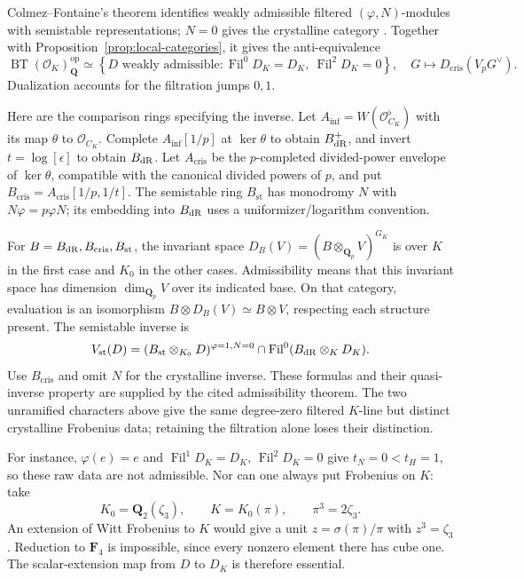 \documentclass[11pt]{article}
\theoremstyle{definition}\newtheorem{definition}[theorem]{Definition}
\theoremstyle{remark}\newtheorem{remark}[theorem]{Remark}
\newcommand{\Q}{\mathbf Q}\newcommand{\Z}{\mathbf Z}
\begin{document}
Colmez--Fontaine's theorem identifies weakly admissible filtered $(\varphi,N)$-modules with semistable representations; $N=0$ gives the crystalline category \cite[Theorem~A, p.~2; Proposition~4.2, Theorem~4.3 and corollary, pp.~23--24]{ColmezFontaineLocal}. Together with Proposition~\ref{prop:local-categories}, it gives the anti-equivalence
\[
 \operatorname{BT}(\mathcal O_K)_{\Q}^{\mathrm{op}}
 \simeq
 \left\{D\text{ weakly admissible}:\operatorname{Fil}^0D_K=D_K,
                              \ \operatorname{Fil}^2D_K=0\right\},
 \quad G\longmapsto D_{\mathrm{cris}}(V_pG^\vee).
\]
Dualization accounts for the filtration jumps $0,1$.

Here are the comparison rings specifying the inverse. Let $A_{\inf}=W(\mathcal O_{C_K}^{\flat})$ with its map $\theta$ to $\mathcal O_{C_K}$. Complete $A_{\inf}[1/p]$ at $\ker\theta$ to obtain $B_{\mathrm{dR}}^+$, and invert $t=\log[\epsilon]$ to obtain $B_{\mathrm{dR}}$. Let $A_{\mathrm{cris}}$ be the $p$-completed divided-power envelope of $\ker\theta$, compatible with the canonical divided powers of $p$, and put $B_{\mathrm{cris}}=A_{\mathrm{cris}}[1/p,1/t]$. The semistable ring $B_{\mathrm{st}}$ has monodromy $N$ with $N\varphi=p\varphi N$; its embedding into $B_{\mathrm{dR}}$ uses a uniformizer/logarithm convention.

For $B=B_{\mathrm{dR}},B_{\mathrm{cris}},B_{\mathrm{st}}$, the invariant space $D_B(V)=(B\otimes_{\Q_p}V)^{G_K}$ is over $K$ in the first case and $K_0$ in the other cases. Admissibility means that this invariant space has dimension $\dim_{\Q_p}V$ over its indicated base. On that category, evaluation is an isomorphism $B\otimes D_B(V)\simeq B\otimes V$, respecting each structure present. The semistable inverse is
\[
 V_{\mathrm{st}}(D)=
 (B_{\mathrm{st}}\otimes_{K_0}D)^{\varphi=1,N=0}
 \cap\operatorname{Fil}^0(B_{\mathrm{dR}}\otimes_KD_K).
\]
Use $B_{\mathrm{cris}}$ and omit $N$ for the crystalline inverse. These formulas and their quasi-inverse property are supplied by the cited admissibility theorem. The two unramified characters above give the same degree-zero filtered $K$-line but distinct crystalline Frobenius data; retaining the filtration alone loses their distinction.

For instance, $\varphi(e)=e$ and $\operatorname{Fil}^1D_K=D_K$, $\operatorname{Fil}^2D_K=0$ give $t_N=0<t_H=1$, so these raw data are not admissible. Nor can one always put Frobenius on $K$: take
\[
 K_0=\Q_2(\zeta_3),\qquad K=K_0(\pi),\qquad \pi^3=2\zeta_3.
\]
An extension of Witt Frobenius to $K$ would give a unit $z=\sigma(\pi)/\pi$ with $z^3=\zeta_3$. Reduction to $\mathbf F_4$ is impossible, since every nonzero element there has cube one. The scalar-extension map from $D$ to $D_K$ is therefore essential.
\end{document}
